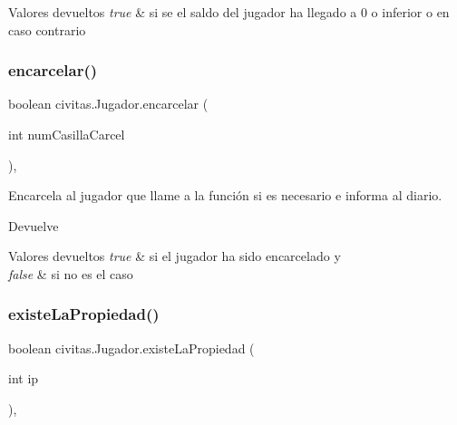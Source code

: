 \begin{DoxyRetVals}{Valores devueltos}
{\em true} & si se el saldo del jugador ha llegado a 0 o inferior o  en caso contrario \\
\hline
\end{DoxyRetVals}
\mbox{\label{classcivitas_1_1Jugador_acc3fb8fdf45c820102c69472605abd3f}} 
\subsubsection{\texorpdfstring{encarcelar()}{encarcelar()}}
{\footnotesize\ttfamily boolean civitas.\+Jugador.\+encarcelar (\begin{DoxyParamCaption}\item[{int}]{num\+Casilla\+Carcel }\end{DoxyParamCaption})\hspace{0.3cm}{\ttfamily [inline]}, {\ttfamily [package]}}

Encarcela al jugador que llame a la función si es necesario e informa al diario. \begin{DoxyReturn}{Devuelve}

\end{DoxyReturn}

\begin{DoxyRetVals}{Valores devueltos}
{\em true} & si el jugador ha sido encarcelado y \\
\hline
{\em false} & si no es el caso \\
\hline
\end{DoxyRetVals}
\mbox{\label{classcivitas_1_1Jugador_a5ae51ea0cc7dd26a7db41fe6cd96dd87}} 
\subsubsection{\texorpdfstring{existe\+La\+Propiedad()}{existeLaPropiedad()}}
{\footnotesize\ttfamily boolean civitas.\+Jugador.\+existe\+La\+Propiedad (\begin{DoxyParamCaption}\item[{int}]{ip }\end{DoxyParamCaption})\hspace{0.3cm}{\ttfamily [inline]}, {\ttfamily [private]}}

